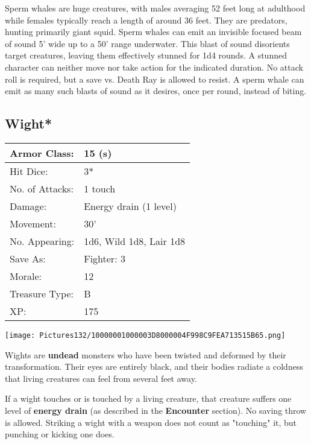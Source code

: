 \documentclass[a4paper,twoside,openany,10pt]{book}
\begin{document}
\begin{multicols}{2}
Sperm whales are huge creatures, with males averaging 52 feet long at adulthood while females typically reach a length of around 36 feet. They are predators, hunting primarily giant squid. Sperm whales can emit an invisible focused beam of sound 5'  wide up to a 50' range underwater. This blast of sound disorients target creatures, leaving them effectively stunned for 1d4 rounds. A stunned character can neither move nor take action for the indicated duration. No attack roll is required, but a save vs. Death Ray is allowed to resist. A sperm whale can emit as many such blasts of sound  as it desires, once per round, instead of biting.

\subsection*{Wight*}\label{wight}

\begin{tabularx}{0.50\textwidth}{@{}lX@{}}
Armor Class: & 15 (s) \\\hline
Hit Dice: & 3* \\\hline
No. of Attacks: & 1 touch \\\hline
Damage: & Energy drain (1 level) \\\hline
Movement: & 30' \\\hline
No. Appearing: & 1d6, Wild 1d8, Lair 1d8 \\\hline
Save As: & Fighter: 3 \\\hline
Morale: & 12 \\\hline
Treasure Type: & B \\\hline
XP: & 175 \\\hline
\end{tabularx}\medskip


\begin{center} \texttt{[image: Pictures132/10000001000003D8000004F998C9FEA713515B65.png]} \end{center}

Wights are \textbf{undead }monsters who have been twisted and deformed by their transformation. Their eyes are entirely black, and their bodies radiate a coldness that living creatures can feel from several feet away. 

If a wight touches or is touched by a living creature, that creature suffers one level of \textbf{energy drain} (as described in the \textbf{Encounter} section). No saving throw is allowed. Striking a wight with a weapon does not count as "touching" it, but punching or kicking one does.


\end{multicols}
\end{document}
